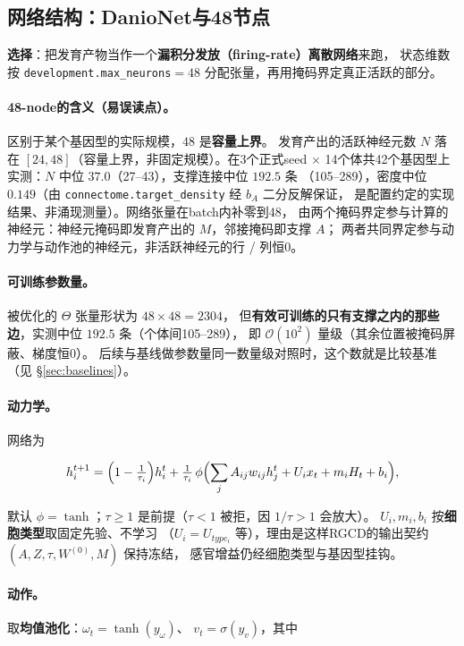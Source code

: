 \subsection{网络结构：DanioNet与48节点}\label{method:net}

\textbf{选择}：把发育产物当作一个\textbf{漏积分发放（firing-rate）离散网络}来跑，
状态维数按 \texttt{development.max\_neurons}$=48$ 分配张量，再用掩码界定真正活跃的部分。

\paragraph{48-node的含义（易误读点）。}区别于某个基因型的实际规模，$48$ 是\textbf{容量上界}。
发育产出的活跃神经元数 $N$ 落在 $[24,48]$（容量上界，非固定规模）。在3个正式seed
$\times$ 14个体共42个基因型上实测：$N$ 中位 $37.0$（27--43），支撑连接中位 $192.5$ 条
（105--289），密度中位 $0.149$（由 \texttt{connectome.target\_density} 经 $b_A$ 二分反解保证，
是配置约定的实现结果、非涌现测量）。网络张量在batch内补零到48，
由两个掩码界定参与计算的神经元：神经元掩码即发育产出的 $M$，邻接掩码即支撑 $A$；
两者共同界定参与动力学与动作池的神经元，非活跃神经元的行 / 列恒0。

\paragraph{可训练参数量。}被优化的 $\Theta$ 张量形状为 $48\times48=2304$，
但\textbf{有效可训练的只有支撑之内的那些边}，实测中位 $192.5$ 条（个体间105--289），
即 $\mathcal O(10^2)$ 量级（其余位置被掩码屏蔽、梯度恒0）。
后续与基线做参数量同一数量级对照时，这个数就是比较基准（见 \S\ref{sec:baselines}）。

\paragraph{动力学。}网络为

\begin{equation}\label{method:eq-dyn}
h_i^{t+1}=\Bigl(1-\tfrac{1}{\tau_i}\Bigr)h_i^{t}
+\tfrac{1}{\tau_i}\,\phi\Bigl(\sum_j A_{ij}w_{ij}h_j^{t}+U_i x_t+m_i H_t+b_i\Bigr),
\end{equation}

默认 $\phi=\tanh$；$\tau\ge1$ 是前提（$\tau<1$ 被拒，因 $1/\tau>1$ 会放大）。
$U_i,m_i,b_i$ 按\textbf{细胞类型}取固定先验、不学习
（$U_i=U_{type_i}$ 等），理由是这样RGCD的输出契约 $(A,Z,\tau,W^{(0)},M)$ 保持冻结，
感官增益仍经细胞类型与基因型挂钩。

\paragraph{动作。}取\textbf{均值池化}：$\omega_t=\tanh(y_\omega)$、
$v_t=\sigma(y_v)$，其中


